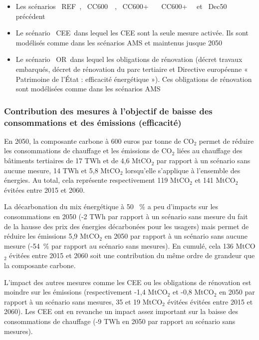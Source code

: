 \documentclass[10.5pt,a4paper]{article}
\begin{document}
{\begin{itemize}
	\item Les scénarios \og~REF~\fg, \og~CC600~\fg~, \og~CC600+~\fg~ \og~CC600+~\fg~ et \og~Dec50~\fg~ précédent
	\item Le scénario \og~CEE~\fg dans lequel les CEE sont la seule mesure activée. Ils sont modélisés comme dans les scénarios AMS et maintenus jusque 2050
	\item Le scénario \og~OR~\fg dans lequel les obligations de rénovation (décret travaux embarqués, décret de rénovation du parc tertiaire et Directive européenne « Patrimoine de l’État : efficacité énergétique »). Ces obligations de rénovation sont modélisées comme dans les scénarios AMS
	
\end{itemize}


\subsubsection{Contribution des mesures à l'objectif de baisse des consommations et des émissions (efficacité)}

En 2050, la composante carbone à 600 euros par tonne de CO$_2$ permet de réduire les consommations de chauffage et les émissions de CO$_2$ liées au chauffage des bâtiments tertiaires de 17 TWh et de 4,6 MtCO$_2$ par rapport à un scénario sans aucune mesure, 14 TWh et 5,8 MtCO$_2$ lorsqu'elle s'applique à l'ensemble des énergies. Au total, cela représente respectivement 119 MtCO$_2$ et 141 MtCO$_2$ évitées entre 2015 et 2060. 

La décarbonation du mix énergétique  à 50 ~\%  a peu d'impacts sur les consommations en 2050 (-2 TWh par rapport à un scénario sans mesure du fait de la hausse des prix des énergies décarbonées pour les usagers) mais permet de réduire  les émissions 5,9 MtCO$_2$ en 2050 par rapport à un scénario sans aucune mesure (-54~\% par rapport au scénario sans mesures). En cumulé, cela 136 MtCO$_2$ évitées entre 2015 et 2060 soit une contribution du même ordre de grandeur que la composante carbone. 

L’impact des autres mesures comme les CEE ou les obligations de rénovation est moindre sur les émissions (respectivement -1,4 MtCO$_2$  et -0,8 MtCO$_2$ en 2050 par rapport à un scénario sans mesures, 35 et 19  MtCO$_2$ évitées évitées entre 2015 et 2060). Les CEE ont en revanche un impact assez important sur la baisse des consommations de chauffage (-9 TWh en 2050 par rapport au scénario sans mesures). 


}
\end{document}
